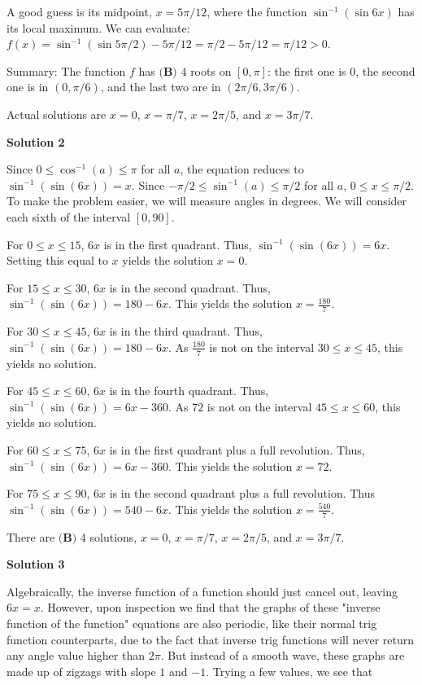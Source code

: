 \begin{enumerate}
 A good guess is its midpoint, $x=5\pi/12$, where the function $\sin^{-1}(\sin 6x)$ has its local maximum. We can evaluate:$f(x) = \sin^{-1}(\sin 5\pi/2) - 5\pi/12 = \pi/2 - 5\pi/12 = \pi/12 > 0$.

 Summary: The function $f$ has $\boxed{\textbf{(B) }4}$ roots on $[0,\pi]$: the first one is $0$, the second one is in $(0,\pi/6)$, and the last two are in $(2\pi/6,3\pi/6)$.

 Actual solutions are $x=0$, $x=\pi/7$, $x=2\pi/5$, and $x=3\pi/7$.

 



\textbf{Solution 2}

Since $0\leq \cos^{-1}(a) \leq \pi$ for all $a$, the equation reduces to $\sin^{-1}(\sin(6x)) = x$. Since $-\pi/2 \leq \sin^{-1}(a) \leq \pi/2$ for all $a$, $0 \leq x \leq \pi/2$. To make the problem easier, we will measure angles in degrees. We will consider each sixth of the interval $[0, 90]$.

 For $0 \leq x \leq 15$, $6x$ is in the first quadrant. Thus, $\sin^{-1}(\sin(6x)) = 6x$. Setting this equal to $x$ yields the solution $x = 0$.

 For $15 \leq x \leq 30$, $6x$ is in the second quadrant. Thus, $\sin^{-1}(\sin(6x)) = 180 - 6x$. This yields the solution $x = \frac{180}7$.

 For $30 \leq x \leq 45$, $6x$ is in the third quadrant. Thus, $\sin^{-1}(\sin(6x)) = 180 - 6x$. As $\frac{180}{7}$ is not on the interval $30 \leq x \leq 45$, this yields no solution.

 For $45 \leq x \leq 60$, $6x$ is in the fourth quadrant. Thus, $\sin^{-1}(\sin(6x)) = 6x - 360$. As $72$ is not on the interval $45 \leq x \leq 60$, this yields no solution.

 For $60 \leq x \leq 75$, $6x$ is in the first quadrant plus a full revolution. Thus, $\sin^{-1}(\sin(6x)) = 6x - 360$. This yields the solution $x = 72$.

 For $75 \leq x \leq 90$, $6x$ is in the second quadrant plus a full revolution. Thus $\sin^{-1}(\sin(6x)) = 540 - 6x$. This yields the solution $x = \frac{540}7$.

 There are $\boxed{\textbf{(B) }4}$ solutions, $x=0$, $x=\pi/7$, $x=2\pi/5$, and $x=3\pi/7$.

 



\textbf{Solution 3}

Algebraically, the inverse function of a function should just cancel out, leaving $6x=x$. However, upon inspection we find that the graphs of these "inverse function of the function" equations are also periodic, like their normal trig function counterparts, due to the fact that inverse trig functions will never return any angle value higher than $2\pi$. But instead of a smooth wave, these graphs are made up of zigzags with slope $1$ and $-1$. Trying a few values, we see that


\end{enumerate}
